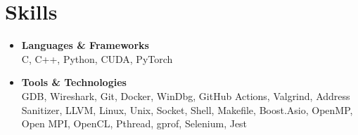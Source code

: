 \documentclass[letterpaper,11pt]{article}
\newcommand{\resumeItem}[2]{
  \item\small{
    \textbf{#1}{\\ #2 \vspace{-4pt}}
  }
}
\newcommand{\resumeSubItem}[2]{\resumeItem{#1}{#2}\vspace{-4pt}}
\newcommand{\resumeSubHeadingListStart}{\begin{itemize}[leftmargin=*]}
\newcommand{\resumeSubHeadingListEnd}{\end{itemize}}
\begin{document}
\section{Skills}
  \resumeSubHeadingListStart
  \resumeSubItem{Languages \& Frameworks}
    {C, C++, Python, CUDA, PyTorch}
  \resumeSubItem{Tools \& Technologies}
    {GDB, Wireshark, Git, Docker, WinDbg, GitHub Actions, Valgrind, Address Sanitizer, LLVM, Linux, Unix, Socket, Shell, Makefile, Boost.Asio, OpenMP, Open MPI, OpenCL, Pthread, gprof, Selenium, Jest}
  \resumeSubHeadingListEnd

\end{document}
